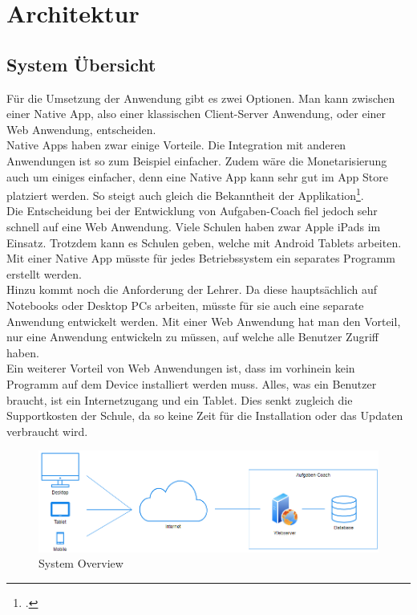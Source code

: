 \section{Architektur}
\subsection{System Übersicht}
Für die Umsetzung der Anwendung gibt es zwei Optionen. Man kann zwischen einer Native App, also einer klassischen Client-Server Anwendung, oder einer Web Anwendung, entscheiden. \\

Native Apps haben zwar einige Vorteile. Die Integration mit anderen Anwendungen ist so zum Beispiel einfacher. Zudem wäre die Monetarisierung auch um einiges einfacher, denn eine Native App kann sehr gut im App Store platziert werden. So steigt auch gleich die Bekanntheit der Applikation\footcite{native_app}. \\

Die Entscheidung bei der Entwicklung von Aufgaben-Coach fiel jedoch sehr schnell auf eine Web Anwendung. Viele Schulen haben zwar Apple iPads im Einsatz. Trotzdem kann es Schulen geben, welche mit Android Tablets arbeiten. Mit einer Native App müsste für jedes Betriebssystem ein separates Programm erstellt werden.\\

Hinzu kommt noch die Anforderung der Lehrer. Da diese hauptsächlich auf Notebooks oder Desktop PCs arbeiten, müsste für sie auch eine separate Anwendung entwickelt werden. Mit einer Web Anwendung hat man den Vorteil, nur eine Anwendung entwickeln zu müssen, auf welche alle Benutzer Zugriff haben.\\

Ein weiterer Vorteil von Web Anwendungen ist, dass im vorhinein kein Programm auf dem Device installiert werden muss. Alles, was ein Benutzer braucht, ist ein Internetzugang und ein Tablet. Dies senkt zugleich die Supportkosten der Schule, da so keine Zeit für die Installation oder das Updaten verbraucht wird.

\begin{figure}[H]
\begin{center}
	\includegraphics[width=\textwidth, keepaspectratio]{images/system_overview.png}
	\caption{System Overview}
	\label{fig:system_overview}
\end{center}
\end{figure}


